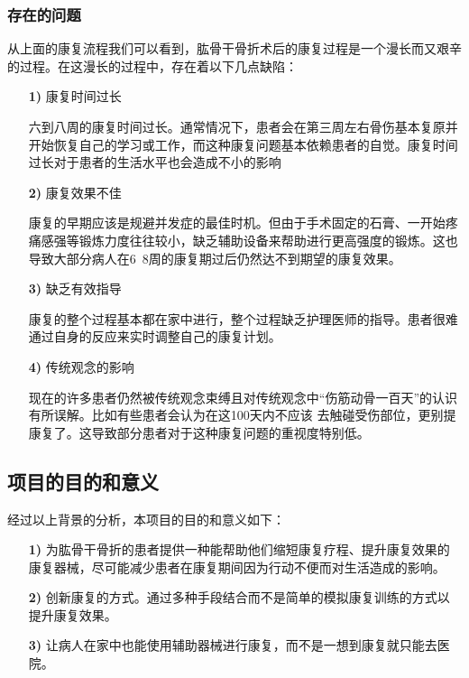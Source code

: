 \documentclass[UTF8]{ctexart}
\begin{document}
        \subsubsection{存在的问题}
            从上面的康复流程我们可以看到，肱骨干骨折术后的康复过程是一个漫长而又艰辛的过程。在这漫长的过程中，存在着以下几点缺陷：
            \begin{enumerate}
                \item [\textbf{1)}]康复时间过长 
                
                    六到八周的康复时间过长。通常情况下，患者会在第三周左右骨伤基本复原并开始恢复自己的学习或工作，而这种康复问题基本依赖患者的自觉。康复时间过长对于患者的生活水平也会造成不小的影响
                
                \item [\textbf{2)}]康复效果不佳
                    
                    康复的早期应该是规避并发症的最佳时机。但由于手术固定的石膏、一开始疼痛感强等锻炼力度往往较小，缺乏辅助设备来帮助进行更高强度的锻炼。这也导致大部分病人在6~8周的康复期过后仍然达不到期望的康复效果。

                \item [\textbf{3)}]缺乏有效指导
                
                    康复的整个过程基本都在家中进行，整个过程缺乏护理医师的指导。患者很难通过自身的反应来实时调整自己的康复计划。
            
                \item [\textbf{4)}]传统观念的影响
                
                    现在的许多患者仍然被传统观念束缚且对传统观念中“伤筋动骨一百天”的认识有所误解。比如有些患者会认为在这100天内不应该 去触碰受伤部位，更别提康复了。这导致部分患者对于这种康复问题的重视度特别低。
            \end{enumerate}

    \subsection{项目的目的和意义}
        经过以上背景的分析，本项目的目的和意义如下：
            \begin{enumerate}
                \item [\textbf{1)}]为肱骨干骨折的患者提供一种能帮助他们缩短康复疗程、提升康复效果的康复器械，尽可能减少患者在康复期间因为行动不便而对生活造成的影响。
                \item [\textbf{2)}]创新康复的方式。通过多种手段结合而不是简单的模拟康复训练的方式以提升康复效果。
                \item [\textbf{3)}]让病人在家中也能使用辅助器械进行康复，而不是一想到康复就只能去医院。
            \end{enumerate}
\newpage
\end{document}
